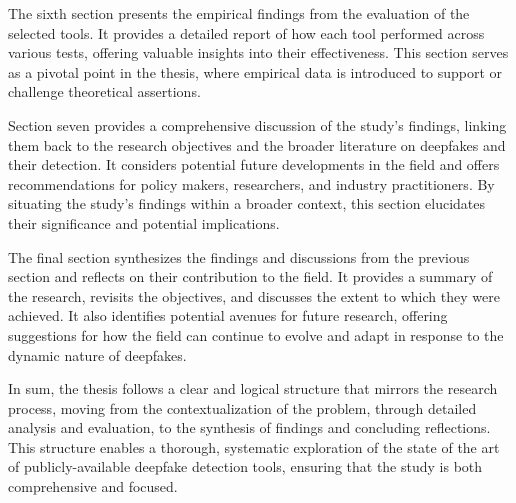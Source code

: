 The sixth section presents the empirical findings from the evaluation of the selected tools. 
It provides a detailed report of how each tool performed across various tests, offering 
valuable insights into their effectiveness. This section serves as a pivotal point in the 
thesis, where empirical data is introduced to support or challenge theoretical assertions.

Section seven provides a comprehensive discussion of the study's findings, linking them back 
to the research objectives and the broader literature on deepfakes and their detection. 
It considers potential future developments in the field and offers recommendations for 
policy makers, researchers, and industry practitioners. By situating the study's findings 
within a broader context, this section elucidates their significance and potential 
implications.

The final section synthesizes the findings and discussions from the previous section and 
reflects on their contribution to the field. It provides a summary of the research, 
revisits the objectives, and discusses the extent to which they were achieved. It also 
identifies potential avenues for future research, offering suggestions for how the 
field can continue to evolve and adapt in response to the dynamic nature of deepfakes.

In sum, the thesis follows a clear and logical structure that mirrors the research 
process, moving from the contextualization of the problem, through detailed analysis 
and evaluation, to the synthesis of findings and concluding reflections. This structure 
enables a thorough, systematic exploration of the state of the art of publicly-available 
deepfake detection tools, ensuring that the study is both comprehensive and focused.